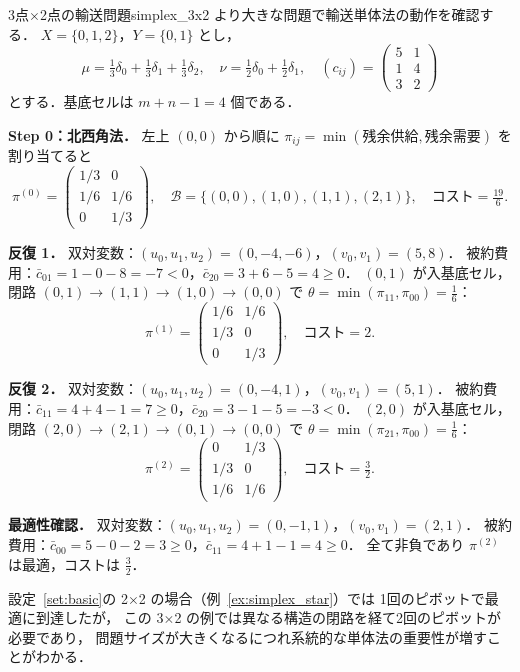 \documentclass[uplatex, dvipdfmx]{jsarticle}
\begin{document}
\begin{example}{3点$\times$2点の輸送問題}{simplex_3x2}
より大きな問題で輸送単体法の動作を確認する．
$X=\{0,1,2\}$，$Y=\{0,1\}$ とし，
\[
  \mu = \tfrac{1}{3}\delta_0 + \tfrac{1}{3}\delta_1 + \tfrac{1}{3}\delta_2,\quad
  \nu = \tfrac{1}{2}\delta_0 + \tfrac{1}{2}\delta_1,\quad
  (c_{ij}) = \begin{pmatrix} 5 & 1 \\ 1 & 4 \\ 3 & 2 \end{pmatrix}
\]
とする．基底セルは $m+n-1=4$ 個である．

\medskip
\textbf{Step 0：北西角法．}
左上 $(0,0)$ から順に $\pi_{ij}=\min(\text{残余供給},\text{残余需要})$ を割り当てると
\[
  \pi^{(0)} = \begin{pmatrix} 1/3 & 0 \\ 1/6 & 1/6 \\ 0 & 1/3 \end{pmatrix}\!,
  \quad \mathcal{B}=\{(0,0),(1,0),(1,1),(2,1)\},
  \quad \text{コスト}=\tfrac{19}{6}.
\]

\textbf{反復 1．}
双対変数：$(u_0,u_1,u_2)=(0,-4,-6)$，$(v_0,v_1)=(5,8)$．
被約費用：$\bar{c}_{01}=1-0-8=-7<0$，$\bar{c}_{20}=3+6-5=4\ge 0$．
$(0,1)$ が入基底セル，
閉路 $(0,1)\to(1,1)\to(1,0)\to(0,0)$ で
$\theta=\min(\pi_{11},\pi_{00})=\tfrac{1}{6}$：
\[
  \pi^{(1)} = \begin{pmatrix} 1/6 & 1/6 \\ 1/3 & 0 \\ 0 & 1/3 \end{pmatrix}\!,
  \quad \text{コスト}=2.
\]

\textbf{反復 2．}
双対変数：$(u_0,u_1,u_2)=(0,-4,1)$，$(v_0,v_1)=(5,1)$．
被約費用：$\bar{c}_{11}=4+4-1=7\ge 0$，$\bar{c}_{20}=3-1-5=-3<0$．
$(2,0)$ が入基底セル，
閉路 $(2,0)\to(2,1)\to(0,1)\to(0,0)$ で
$\theta=\min(\pi_{21},\pi_{00})=\tfrac{1}{6}$：
\[
  \pi^{(2)} = \begin{pmatrix} 0 & 1/3 \\ 1/3 & 0 \\ 1/6 & 1/6 \end{pmatrix}\!,
  \quad \text{コスト}=\tfrac{3}{2}.
\]

\textbf{最適性確認．}
双対変数：$(u_0,u_1,u_2)=(0,-1,1)$，$(v_0,v_1)=(2,1)$．
被約費用：$\bar{c}_{00}=5-0-2=3\ge 0$，$\bar{c}_{11}=4+1-1=4\ge 0$．
全て非負であり $\pi^{(2)}$ は最適，コストは $\tfrac{3}{2}$．

設定~\ref{set:basic}の 2$\times$2 の場合（例~\ref{ex:simplex_star}）では
1回のピボットで最適に到達したが，
この 3$\times$2 の例では異なる構造の閉路を経て2回のピボットが必要であり，
問題サイズが大きくなるにつれ系統的な単体法の重要性が増すことがわかる．
\end{example}
\end{document}
